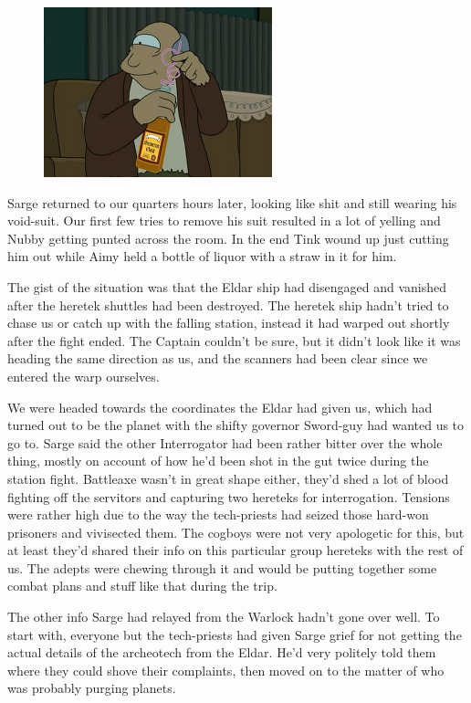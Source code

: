 \begin{figure}
	\begin{center}
		\includegraphics[width=\figwidth]{pics/11/65.png}
	\end{center}
\end{figure}
Sarge returned to our quarters hours later, looking like shit and still wearing his void-suit. 
Our first few tries to remove his suit resulted in a lot of yelling and Nubby getting punted across the room. 
In the end Tink wound up just cutting him out while Aimy held a bottle of liquor with a straw in it for him.

The gist of the situation was that the Eldar ship had disengaged and vanished after the heretek shuttles had been destroyed. 
The heretek ship hadn't tried to chase us or catch up with the falling station, instead it had  warped out shortly after the fight ended. 
The Captain couldn't be sure, but it didn't look like it was heading the same direction as us, and the scanners had been clear since we entered the warp ourselves.

We were headed towards the coordinates the Eldar had given us, which had turned out to be the planet with the shifty governor Sword-guy had wanted us to go to. 
Sarge said the other Interrogator had been rather bitter over the whole thing, mostly on account of how he'd been shot in the gut twice during the station fight. 
Battleaxe wasn't in great shape either, they'd shed a lot of blood fighting off the servitors and capturing two hereteks for interrogation. 
Tensions were rather high due to the way the tech-priests had seized those hard-won prisoners and vivisected them. 
The cogboys were not very apologetic for this, but at least they'd shared their info on this particular group hereteks with the rest of us. 
The adepts were chewing through it and would be putting together some combat plans and stuff like that during the trip.

The other info Sarge had relayed from the Warlock hadn't gone over well. 
To start with, everyone but the tech-priests had given Sarge grief for not getting the actual details of the archeotech from the Eldar. 
He'd very politely told them where they could shove their complaints, then moved on to the matter of who was probably purging planets. 


